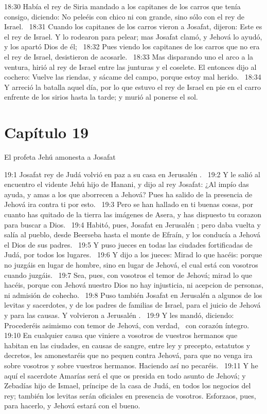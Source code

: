 																		18:30 Había el rey de Siria mandado a los capitanes de los carros que tenía consigo, diciendo: No peleéis con chico ni con grande, sino sólo con el rey de Israel.  
																		18:31 Cuando los capitanes de los carros vieron a Josafat, dijeron: Este es el rey de Israel. Y lo rodearon para pelear; mas Josafat clamó, y Jehová lo ayudó, y los apartó Dios de él;  
																		18:32 Pues viendo los capitanes de los carros que no era el rey de Israel, desistieron de acosarle.  
																		18:33 Mas disparando uno el arco a la ventura, hirió al rey de Israel entre las junturas y el coselete. El entonces dijo al cochero: Vuelve las riendas, y sácame del campo, porque estoy mal herido.  
																		18:34 Y arreció la batalla aquel día, por lo que estuvo el rey de Israel en pie en el carro enfrente de los sirios hasta la tarde; y murió al ponerse el sol. 
																		
																		\section*{Capítulo 19 }
																			El profeta Jehú amonesta a Josafat  
																			
																			19:1 Josafat rey de Judá volvió en paz a su casa en Jerusalén .  
																			19:2 Y le salió al encuentro el vidente Jehú hijo de Hanani, y dijo al rey Josafat: ¿Al impío das ayuda, y amas a los que aborrecen a Jehová? Pues ha salido de la presencia de Jehová ira contra ti por esto.  
																			19:3 Pero se han hallado en ti buenas cosas, por cuanto has quitado de la tierra las imágenes de Asera, y has dispuesto tu corazon para buscar a Dios.  
																			19:4 Habitó, pues, Josafat en Jerusalén ; pero daba vuelta y salía al pueblo, desde Beerseba hasta el monte de Efraín, y los conducía a Jehová el Dios de sus padres.  
																			19:5 Y puso jueces en todas las ciudades fortificadas de Judá, por todos los lugares.  
																			19:6 Y dijo a los jueces: Mirad lo que hacéis: porque no juzgáis en lugar de hombre, sino en lugar de Jehová, el cual está con vosotros cuando juzgáis.  
																			19:7 Sea, pues, con vosotros el temor de Jehová; mirad lo que hacéis, porque con Jehová nuestro Dios no hay injusticia, ni acepcion de personas, ni admisión de cohecho.  
																			19:8 Puso también Josafat en Jerusalén a algunos de los levitas y sacerdotes, y de los padres de familias de Israel, para el juicio de Jehová y para las causas. Y volvieron a Jerusalén .  
																			19:9 Y les mandó, diciendo: Procederéis asimismo con temor de Jehová, con verdad,  con corazón íntegro.  
																			19:10 En cualquier causa que viniere a vosotros de vuestros hermanos que habitan en las ciudades, en causas de sangre, entre ley y precepto, estatutos y decretos, les amonestaréis que no pequen contra Jehová, para que no venga ira sobre vosotros y sobre vuestros hermanos. Haciendo así no pecaréis.  
																			19:11 Y he aquí el sacerdote Amarías será el que os presida en todo asunto de Jehová; y Zebadías hijo de Ismael, príncipe de la casa de Judá, en todos los negocios del rey; también los levitas serán oficiales en presencia de vosotros. Esforzaos, pues, para hacerlo, y Jehová estará con el bueno.  
